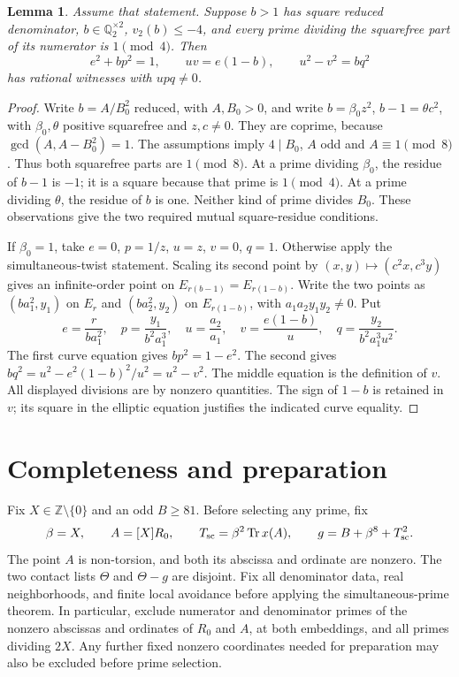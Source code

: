 \documentclass[11pt,a4paper]{article}
\newtheorem{lemma}[theorem]{Lemma}
\newcommand{\Q}{\mathbb Q}\newcommand{\Z}{\mathbb Z}
\DeclareMathOperator{\Tr}{Tr}\DeclareMathOperator{\Nm}{Nm}
\begin{document}
\begin{lemma}\label{lem:largepole}
Assume that statement. Suppose $b>1$ has square reduced denominator,
$b\in\Q_2^{\times2}$, $v_2(b)\le-4$, and every prime dividing
the squarefree part of its numerator is $1\pmod4$.
Then
\[
 e^2+bp^2=1,\qquad uv=e(1-b),\qquad u^2-v^2=bq^2
\]
has rational witnesses with $upq\ne0$.
\end{lemma}
\begin{proof}
Write $b=A/B_0^2$ reduced, with $A,B_0>0$, and write
$b=\beta_0 z^2$, $b-1=\theta c^2$, with $\beta_0,\theta$
positive squarefree and $z,c\ne0$. They are coprime, because
$\gcd(A,A-B_0^2)=1$.
The assumptions imply $4\mid B_0$, $A$ odd and $A\equiv1\pmod8$.
Thus both squarefree parts are $1\pmod8$.
At a prime dividing $\beta_0$, the residue of $b-1$ is $-1$;
it is a square because that prime is $1\pmod4$.
At a prime dividing $\theta$, the residue of $b$ is one.
Neither kind of prime divides $B_0$. These observations give the
two required mutual square-residue conditions.

If $\beta_0=1$, take $e=0$, $p=1/z$, $u=z$, $v=0$, $q=1$.
Otherwise apply the simultaneous-twist statement. Scaling its second
point by $(x,y)\mapsto(c^2x,c^3y)$ gives an infinite-order point
on $E_{r(b-1)}=E_{r(1-b)}$. Write the two points as
$(ba_1^2,y_1)$ on $E_r$ and $(ba_2^2,y_2)$ on $E_{r(1-b)}$,
with $a_1a_2y_1y_2\ne0$. Put
\[
 e=\frac{r}{ba_1^2},\quad p=\frac{y_1}{b^2a_1^3},\quad
 u=\frac{a_2}{a_1},\quad v=\frac{e(1-b)}u,\quad
 q=\frac{y_2}{b^2a_1^3u^2}.
\]
The first curve equation gives $bp^2=1-e^2$.
The second gives $bq^2=u^2-e^2(1-b)^2/u^2=u^2-v^2$.
The middle equation is the definition of $v$.
All displayed divisions are by nonzero quantities. The sign of
$1-b$ is retained in $v$; its square in the elliptic equation
justifies the indicated curve equality.
\end{proof}

\section{Completeness and preparation}\label{sec:completeness}
Fix $X\in\Z\setminus\{0\}$ and an odd $B\ge81$. Before selecting
any prime, fix
\[
 \beta=X,\qquad A=[X]R_0,\qquad
 T_{\rm sc}=\beta^2\Tr x(A),\qquad g=B+\beta^8+T_{\rm sc}^2.
\]
The point $A$ is non-torsion, and both its abscissa and ordinate
are nonzero. The two contact lists $\Theta$ and $\Theta-g$ are
disjoint. Fix all denominator data, real neighborhoods, and finite
local avoidance before applying the simultaneous-prime theorem.
In particular, exclude numerator and denominator primes of the
nonzero abscissas and ordinates of $R_0$ and $A$, at both embeddings,
and all primes dividing $2X$. Any further fixed nonzero coordinates
needed for preparation may also be excluded before prime selection.
\end{document}
